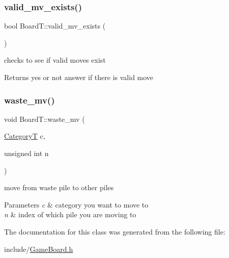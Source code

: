\subsubsection{\texorpdfstring{valid\+\_\+mv\+\_\+exists()}{valid\_mv\_exists()}}
{\footnotesize\ttfamily bool Board\+T\+::valid\+\_\+mv\+\_\+exists (\begin{DoxyParamCaption}{ }\end{DoxyParamCaption})}



checks to see if valid moves exist 

\begin{DoxyReturn}{Returns}
yes or not answer if there is valid move 
\end{DoxyReturn}
\mbox{\label{class_board_t_a2656775270574758d508b3e6b026d711}} 
\subsubsection{\texorpdfstring{waste\+\_\+mv()}{waste\_mv()}}
{\footnotesize\ttfamily void Board\+T\+::waste\+\_\+mv (\begin{DoxyParamCaption}\item[{\hyperlink{_card_types_8h_aa77f81f8d4c8aa57046a50ca32d6b7b4}{CategoryT}}]{c,  }\item[{unsigned int}]{n }\end{DoxyParamCaption})}



move from waste pile to other piles 


\begin{DoxyParams}{Parameters}
{\em c} & category you want to move to \\
\hline
{\em n} & index of which pile you are moving to \\
\hline
\end{DoxyParams}


The documentation for this class was generated from the following file\+:\begin{DoxyCompactItemize}
\item 
include/\hyperlink{_game_board_8h}{Game\+Board.\+h}\end{DoxyCompactItemize}
